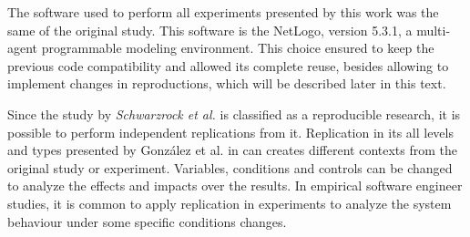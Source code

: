 The software used to perform all experiments presented by this work was the same of the original study\cite{MAS07}. This software is the NetLogo, version 5.3.1, a multi-agent programmable modeling environment. This choice ensured to keep the previous code compatibility and allowed its complete reuse, besides allowing to implement changes in reproductions, which will be described later in this text.



Since the study by \textit{Schwarzrock et al.}\cite{MAS07} is classified as a reproducible research, it is possible to perform independent replications from it. Replication in its all levels and types presented by González et al. in \cite{exp03} can creates different contexts from the original study or experiment. Variables, conditions and controls can be changed to analyze the effects and impacts over the results. In empirical software engineer studies, it is common to apply replication in experiments to analyze the system behaviour under some specific conditions changes.
